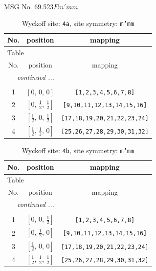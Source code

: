 \documentclass[fleqn,8pt]{jsarticle}
\begin{document}
\setcounter{MaxMatrixCols}{32}

\renewcommand{\tablename}{Table~}
\renewcommand{\figurename}{Figure~}
\begin{center}
\LARGE
MSG No. 69.523\quad$Fm'mm$
\end{center}
\renewcommand{\arraystretch}{1.2}
\begin{longtable}{ccc}
\caption{Wyckoff site: {\tt 4a}, site symmetry: {\tt m'mm}}
 \\
 \hline \hline
No. & position & mapping \\ \hline \endfirsthead

\multicolumn{2}{l}{\tablename\ \thetable{}} \\
 \hline \hline
No. & position & mapping \\ \hline \endhead

 \hline \hline
\multicolumn{2}{r}{\footnotesize\it continued ...} \\ \endfoot

 \hline \hline
\multicolumn{2}{r}{} \\ \endlastfoot

1 & $\left[ 0,\, 0,\, 0 \right]$ & {\tt [1,2,3,4,5,6,7,8]} \\ \hline
2 & $\left[ 0,\, \frac{1}{2},\, \frac{1}{2} \right]$ & {\tt [9,10,11,12,13,14,15,16]} \\ \hline
3 & $\left[ \frac{1}{2},\, 0,\, \frac{1}{2} \right]$ & {\tt [17,18,19,20,21,22,23,24]} \\ \hline
4 & $\left[ \frac{1}{2},\, \frac{1}{2},\, 0 \right]$ & {\tt [25,26,27,28,29,30,31,32]} \\
\end{longtable}
\renewcommand{\arraystretch}{1.2}
\begin{longtable}{ccc}
\caption{Wyckoff site: {\tt 4b}, site symmetry: {\tt m'mm}}
 \\
 \hline \hline
No. & position & mapping \\ \hline \endfirsthead

\multicolumn{2}{l}{\tablename\ \thetable{}} \\
 \hline \hline
No. & position & mapping \\ \hline \endhead

 \hline \hline
\multicolumn{2}{r}{\footnotesize\it continued ...} \\ \endfoot

 \hline \hline
\multicolumn{2}{r}{} \\ \endlastfoot

1 & $\left[ 0,\, 0,\, \frac{1}{2} \right]$ & {\tt [1,2,3,4,5,6,7,8]} \\ \hline
2 & $\left[ 0,\, \frac{1}{2},\, 0 \right]$ & {\tt [9,10,11,12,13,14,15,16]} \\ \hline
3 & $\left[ \frac{1}{2},\, 0,\, 0 \right]$ & {\tt [17,18,19,20,21,22,23,24]} \\ \hline
4 & $\left[ \frac{1}{2},\, \frac{1}{2},\, \frac{1}{2} \right]$ & {\tt [25,26,27,28,29,30,31,32]} \\
\end{longtable}
\end{document}
